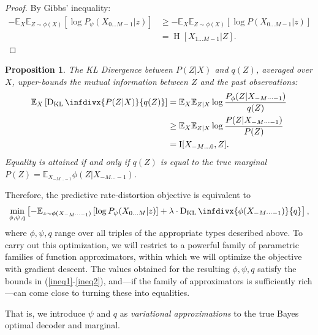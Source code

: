 \documentclass[11pt,letterpaper]{article}
\newcommand{\E}[0]{\mathbb{E}}
\newcounter{theorem}
\newtheorem{proposition}[theorem]{Proposition}
\begin{document}
\begin{proof}
By Gibbs' inequality:
\begin{align*}
	-	\mathbb{E}_{X}\mathbb{E}_{Z \sim \phi(X)}\left[\log P_\psi(X_{0\dots M-1} | z)\right] & \geq -	\mathbb{E}_{X}\mathbb{E}_{Z \sim \phi(X)}\left[\log P(X_{0\dots M-1} | z)\right]\\
	&= \operatorname{H}[X_{1\dots M-1}|Z].
\end{align*}
\end{proof}

\begin{proposition} 
The KL Divergence between $P(Z|X)$ and $q(Z)$, averaged over $X$, upper-bounds the mutual information between $Z$ and the past observations:
\begin{equation}\label{ineq2}
\begin{aligned}
	\mathbb{E}_{X}\left[ \operatorname{D_{KL}}\infdivx{P(Z|X)}{q(Z)}\right] &=   \mathbb{E}_{X} \mathbb{E}_{Z|X} \log \frac{P_\phi(Z|X_{-M\dots -1})}{q(Z)}  \\
	& \geq  \mathbb{E}_{X} \mathbb{E}_{Z|X} \log \frac{P(Z|X_{-M\dots -1})}{P(Z)}  \\
	& = \operatorname{I}[X_{-M\dots 0},Z].
\end{aligned}
\end{equation}
Equality is attained if and only if $q(Z)$ is equal to the true marginal $P(Z) = \E_{X_{-M \dots -1}} \phi(Z|X_{-M \dots -1})$.
\end{proposition}

Therefore, the predictive rate-distortion objective is equivalent to
\begin{equation}\label{eq:bound}
	\min_{\phi, \psi, q}	\left[-	\mathbb{E}_{z \sim \phi(X_{-M\dots-1})}\left[\log P_\psi(X_{0\dots M} | z)\right] + \lambda \cdot \operatorname{D_{KL}}\infdivx{\phi(X_{-M\dots-1})}{q}\right],
\end{equation} %
where $\phi, \psi, q$ range over all triples of the appropriate types described above.
To carry out this optimization, we will restrict to a powerful family of parametric families of function approximators, within which we will optimize the objective with gradient descent.
The values obtained for the resulting $\phi, \psi, q$ satisfy the bounds in (\ref{ineq1}-\ref{ineq2}), and---if the family of approximators is sufficiently rich---can come close to turning these into equalities.

That is, we introduce $\psi$ and $q$ as \emph{variational approximations} \citep{blei-variational-2016} to the true Bayes optimal decoder and marginal. 
\end{document}
